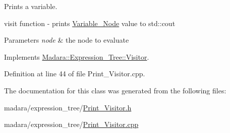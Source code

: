 Prints a variable. 

visit function -\/ prints \hyperlink{classMadara_1_1Expression__Tree_1_1Variable__Node}{Variable\_\-Node} value to std::cout


\begin{DoxyParams}{Parameters}
{\em node} & the node to evaluate \\
\hline
\end{DoxyParams}


Implements \hyperlink{classMadara_1_1Expression__Tree_1_1Visitor_a5dea5d0d83eb683ab0341a4d45fd271a}{Madara::Expression\_\-Tree::Visitor}.



Definition at line 44 of file Print\_\-Visitor.cpp.



The documentation for this class was generated from the following files:\begin{DoxyCompactItemize}
\item 
madara/expression\_\-tree/\hyperlink{Print__Visitor_8h}{Print\_\-Visitor.h}\item 
madara/expression\_\-tree/\hyperlink{Print__Visitor_8cpp}{Print\_\-Visitor.cpp}\end{DoxyCompactItemize}

